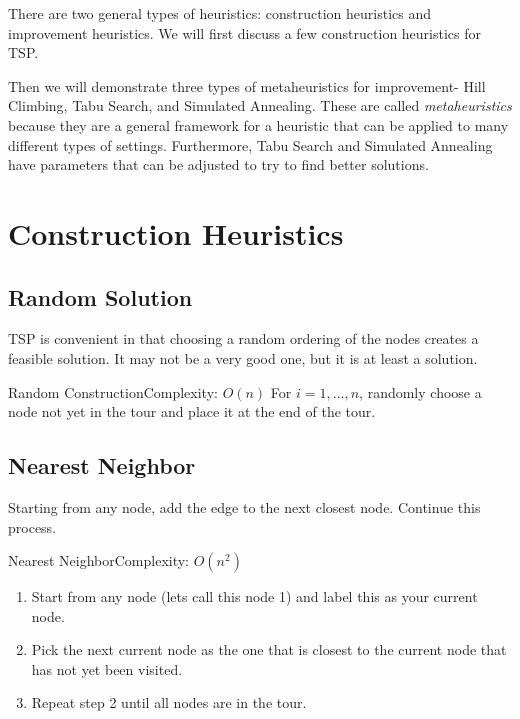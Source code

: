 There are two general types of heuristics: construction heuristics and improvement heuristics.  We will first discuss a few construction heuristics for TSP.


Then we will demonstrate three types of metaheuristics for improvement- Hill Climbing, Tabu Search, and Simulated Annealing.  These are called \emph{metaheuristics} because they are a general framework for a heuristic that can be applied to many different types of settings.  Furthermore, Tabu Search and Simulated Annealing have parameters that can be adjusted to try to find better solutions.  

\section{Construction Heuristics}
\subsection{Random Solution}
TSP is convenient in that choosing a random ordering of the nodes creates a feasible solution.  It may not be a very good one, but it is at least a solution.

\begin{general}{Random Construction}{Complexity: $O(n)$}
\label{heuristic:random}
For $i=1, \dots, n$, randomly choose a node not yet in the tour and place it at the end of the tour.
\end{general}

\subsection{Nearest Neighbor}
Starting from any node, add the edge to the next closest node.  Continue this process.
\begin{general}{Nearest Neighbor}{Complexity: $O(n^2)$}
\label{heuristic:nearestNeighbor}
\begin{enumerate}
\item Start from any node (lets call this node 1) and label this as your current node.
\item Pick the next current node as the one that is closest to the current node that has not yet been visited.
\item Repeat step 2 until all nodes are in the tour.
\end{enumerate}
\end{general}

